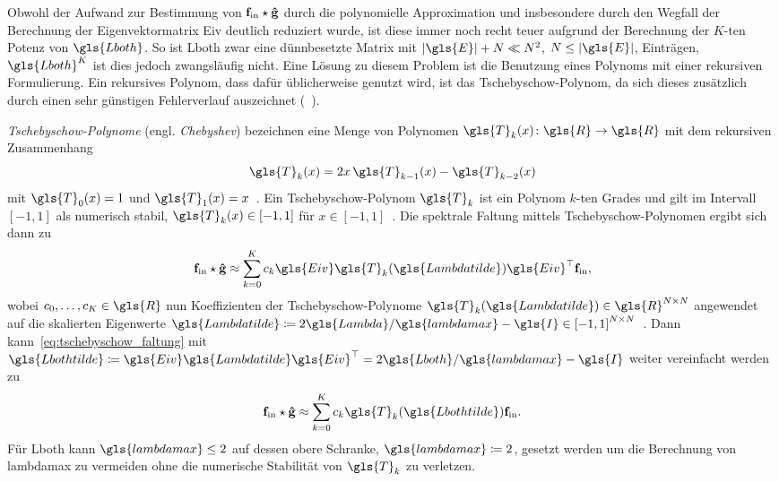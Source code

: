 Obwohl der Aufwand zur Bestimmung von $\mathbf{f}_{\mathrm{in}} \star \mathbf{\hat g}$ durch die polynomielle Approximation und insbesondere durch den Wegfall der Berechnung der Eigenvektormatrix \gls{Eiv} deutlich reduziert wurde, ist diese immer noch recht teuer aufgrund der Berechnung der $K$-ten Potenz von $\gls{Lboth}$.
So ist \gls{Lboth} zwar eine dünnbesetzte Matrix mit $\left|\gls{E}\right| + N \ll N^2$, $N \leq \left|\gls{E}\right|$, Einträgen, $\gls{Lboth}^K$ ist dies jedoch zwangsläufig nicht.
Eine Lösung zu diesem Problem ist die Benutzung eines Polynoms mit einer rekursiven Formulierung.
Ein rekursives Polynom, dass dafür üblicherweise genutzt wird, ist das Tschebyschow-Polynom, da sich dieses zusätzlich durch einen sehr günstigen Fehlerverlauf auszeichnet (\vgl{}~\cite{Hammond}).

\emph{Tschebyschow-Polynome} (engl. \emph{Chebyshev}) bezeichnen eine Menge von Polynomen $\gls{T}_k\left(x\right) \colon \gls{R} \to \gls{R}$ mit dem rekursiven Zusammenhang
\begin{equation*}
  \gls{T}_k\left(x\right) = 2x\, \gls{T}_{k-1}\left(x\right) - \gls{T}_{k-2}\left(x\right)
\end{equation*}
mit $\gls{T}_0\left(x\right) = 1$ und $\gls{T}_1\left(x\right) = x$~\cite{Hammond}.
Ein Tschebyschow-Polynom $\gls{T}_k$ ist ein Polynom $k$-ten Grades und gilt im Intervall $\left[-1, 1\right]$ als numerisch stabil, \dhe{} $\gls{T}_k\left(x\right) \in \left[-1, 1\right]$ für $x \in \left[-1, 1\right]$~\cite{Hammond}.
Die spektrale Faltung mittels Tschebyschow-Polynomen ergibt sich dann zu
\begin{equation}
  \ve{f}_{\mathrm{in}} \star \ve{\hat g} \approx \sum_{k=0}^K c_k\gls{Eiv}\gls{T}_k\left(\gls{Lambdatilde}\right)\gls{Eiv}^{\top}\ve{f}_{\mathrm{in}},
  \label{eq:tschebyschow_faltung}
\end{equation}
wobei $c_0, \ldots, c_K \in \gls{R}$ nun Koeffizienten der Tschebyschow-Polynome $\gls{T}_k\left(\gls{Lambdatilde}\right) \in \gls{R}^{N \times N}$ angewendet auf die skalierten Eigenwerte $\gls{Lambdatilde} \coloneqq 2\gls{Lambda}/\gls{lambdamax} - \gls{I} \in {\left[-1, 1\right]}^{N \times N}$~\cite{Defferrard}.
Dann kann~\eqref{eq:tschebyschow_faltung} mit $\gls{Lbothtilde} \coloneqq \gls{Eiv}\gls{Lambdatilde}\gls{Eiv}^{\top} = 2\gls{Lboth}/\gls{lambdamax} - \gls{I}$ weiter vereinfacht werden zu~\cite{Defferrard}
\begin{equation}
  \ve{f}_{\mathrm{in}} \star \ve{\hat g} \approx \sum_{k=0}^K c_k\gls{T}_k\left(\gls{Lbothtilde}\right)\ve{f}_{\mathrm{in}}.
  \label{eq:tschebyschow_faltung_L}
\end{equation}
Für \gls{Lboth} kann $\gls{lambdamax} \leq 2$ auf dessen obere Schranke, \dhe{} $\gls{lambdamax} \coloneqq 2$, gesetzt werden um die Berechnung von \gls{lambdamax} zu vermeiden ohne die numerische Stabilität von $\gls{T}_k$ zu verletzen.

